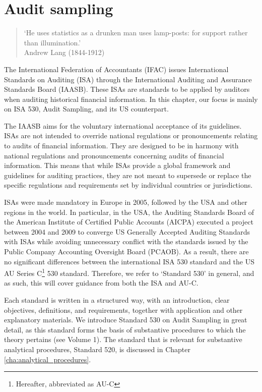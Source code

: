 \chapter{Audit sampling} %
\label{cha:sampling}

\begin{quote}
`He uses statistics as a drunken man uses lamp-posts: for support rather than illumination.'\\
Andrew Lang (1844-1912)
\end{quote}

The International Federation of Accountants (IFAC) issues In\-ter\-na\-tional Standards on Auditing (ISA) through the International Auditing and Assurance Standards Board (IAASB). These ISAs are standards to be applied by auditors when auditing historical financial information. In this chapter, our focus is mainly on ISA 530, Audit Sampling, and its US counterpart.

The IAASB aims for the voluntary international acceptance of its guidelines. ISAs are not intended to override national regulations or pronouncements relating to audits of financial information. They are designed to be in harmony with national regulations and pronouncements concerning audits of financial information. This means that while ISAs provide a global framework and guidelines for auditing practices, they are not meant to supersede or replace the specific regulations and requirements set by individual countries or jurisdictions.

ISAs were made mandatory in Europe in 2005, followed by the USA and other regions in the world. In particular, in the USA, the Auditing Standards Board of the American Institute of Certified Public Accounts (AICPA) executed a project between 2004 and 2009 to converge US Generally Accepted Auditing Standards  with ISAs while avoiding unnecessary conflict with the standards issued by the Public Company Accounting Oversight Board (PCAOB). As a result, there are no significant differences between the international ISA 530 standard and the US AU Series C\footnote{Hereafter, abbreviated as AU-C} 530 standard. Therefore, we refer to `Standard 530' in general, and as such, this will cover guidance from both the ISA and AU-C.

Each standard is written in a structured way, with an introduction, clear objectives, definitions, and requirements, together with application and other explanatory materials. We introduce Standard 530 on Audit Sampling in great detail, as this standard forms the basis of substantive procedures to which the theory pertains (see Volume 1). The standard that is relevant for substantive analytical procedures, Standard 520, is discussed in Chapter \ref{cha:analytical_procedures}.

